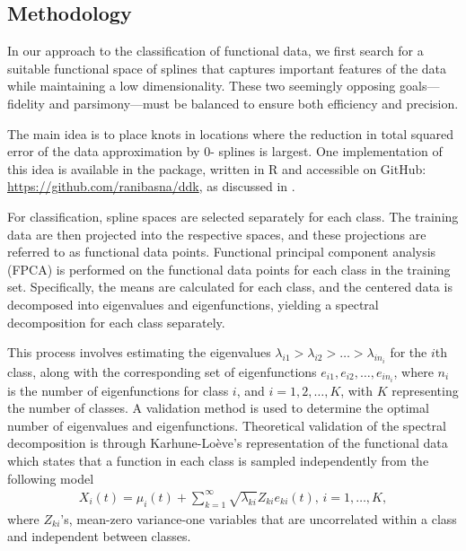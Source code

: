 \vspace{-.13cm}
\subsection{Methodology} \vspace{-.22cm}

In our approach to the classification of functional data, we first search for a suitable functional space of splines that captures important features of the data while maintaining a low dimensionality. These two seemingly opposing goals—fidelity and parsimony—must be balanced to ensure both efficiency and precision.

The main idea is to place knots in locations where the reduction in total squared error of the data approximation by 0- splines is largest. One implementation of this idea is available in the  package, written in R and accessible on GitHub: \url{https://github.com/ranibasna/ddk}, as discussed in \citep{basna2022data}.

For classification, spline spaces are selected separately for each class. The training data are then projected into the respective spaces, and these projections are referred to as functional data points. Functional principal component analysis (FPCA) is performed on the functional data points for each class in the training set. Specifically, the means are calculated for each class, and the centered data is decomposed into eigenvalues and eigenfunctions, yielding a spectral decomposition for each class separately.

This process involves estimating the eigenvalues ${\lambda_{i1}> \lambda_{i2} >\dots > \lambda_{in_i}}$ for the $i$th class, along with the corresponding set of eigenfunctions ${e_{i1}, e_{i2},\dots, e_{in_i}}$, where $n_i$ is the number of eigenfunctions for class $i$, and $i=1, 2, \dots, K$, with $K$ representing the number of classes. A validation method is used to determine the optimal number of eigenvalues and eigenfunctions. Theoretical validation of the spectral decomposition is through Karhune-Lo\`eve's representation of the functional data which states that a function in each class is sampled independently from the following model 
\begin{align}
\label{eq:spectdec}
X_i(t)=\mu_i(t) +\sum_{k=1}^\infty \sqrt{\lambda_{ki}} Z_{ki} e_{ki}(t),\, i=1,\dots, K,  
\end{align}
where $Z_{ki}$'s, mean-zero variance-one variables that are uncorrelated within a class and independent between classes. 

